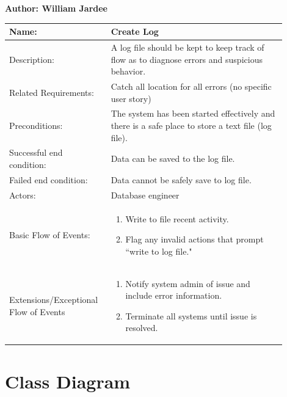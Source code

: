 \documentclass[11pt]{article}
\begin{document}
\begin{table}[!ht]
\begin{center}
\textbf{Author: William Jardee}
\vspace*{1em}

\begin{tabular}{p{0.30\linewidth}p{0.60\linewidth}}
	Name: & Create Log\\\hline
	Description: & A log file should be kept to keep track of flow as to diagnose errors and suspicious behavior.\\\hline
	Related Requirements:& Catch all location for all errors (no specific user story)\\\hline
	Preconditions:& The system has been started effectively and there is a safe place to store a text file (log file).\\\hline
	Successful end condition:& Data can be saved to the log file.\\\hline
	Failed end condition:& Data cannot be safely save to log file.\\\hline
	Actors:& Database engineer \\\hline
	Basic Flow of Events: & \begin{enumerate}
	\item Write to file recent activity.
	\item Flag any invalid actions that prompt ``write to log file."
	\end{enumerate}\\\hline
	Extensions/Exceptional Flow of Events & \begin{enumerate}
	\item Notify system admin of issue and include error information.
	\item Terminate all systems until issue is resolved.
	\end{enumerate}
\end{tabular}
\label{des:create_log}
\end{center}
\end{table}

\clearpage



\section*{Class Diagram}
\end{document}
